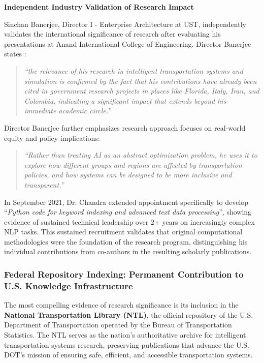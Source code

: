 \textbf{Independent Industry Validation of Research Impact}

Sinchan Banerjee, Director I - Enterprise Architecture at UST, independently validates the international significance of \drs research after evaluating his presentations at Anand International College of Engineering. Director Banerjee states \cite{LOR4}:

\begin{quote}
\textit{``the relevance of his research in intelligent transportation systems and simulation is confirmed by the fact that his contributions have already been cited in government research projects in places like Florida, Italy, Iran, and Colombia, indicating a significant impact that extends beyond his immediate academic circle.''}
\end{quote}

Director Banerjee further emphasizes \drs research approach focuses on real-world equity and policy implications:

\begin{quote}
\textit{``Rather than treating AI as an abstract optimization problem, he uses it to explore how different groups and regions are affected by transportation policies, and how systems can be designed to be more inclusive and transparent.''}
\end{quote}

In September 2021, Dr. Chandra extended \drs appointment specifically to develop ``\textit{Python code for keyword indexing and advanced text data processing}'', showing evidence of sustained technical leadership over 2+ years on increasingly complex NLP tasks. This sustained recruitment validates that \drs original computational methodologies were the foundation of the research program, distinguishing his individual contributions from co-authors in the resulting scholarly publications.


\subsubsection{Federal Repository Indexing: Permanent Contribution to U.S. Knowledge Infrastructure}
\label{scholar:federal_indexing}

The most compelling evidence of \drs research significance is its inclusion in the \textbf{National Transportation Library (NTL)}, the official repository of the U.S. Department of Transportation operated by the Bureau of Transportation Statistics. The NTL serves as the nation's authoritative archive for intelligent transportation systems research, preserving publications that advance the U.S. DOT's mission of ensuring safe, efficient, and accessible transportation systems.

